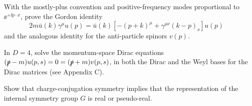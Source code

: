 \begin{banksproblems}
With the mostly-plus convention and positive-frequency modes proportional to
$\ee^{+\ii p\cdot x}$, prove the Gordon identity
\begin{equation*}
  2m\bar u(k)\gamma^\mu u(p)=\bar u(k)\left[-(p+k)^\mu+\gamma^{\mu\nu}(k-p)_\nu\right]u(p)
\end{equation*}
and the analogous identity for the anti-particle spinors $v(p)$.

In $D=4$, solve the momentum-space Dirac equations
$(\slashed p-m)u(p,s)=0=(\slashed p+m)v(p,s)$,
in both the Dirac and the Weyl bases for the Dirac matrices (see Appendix C).

Show that charge-conjugation symmetry implies that the representation of the
internal symmetry group $G$ is real or pseudo-real.

\end{banksproblems}
